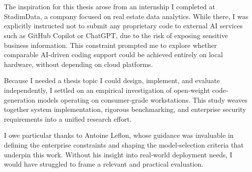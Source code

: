 \chapter*{}%
\label{ch:voorwoord}

The inspiration for this thesis arose from an internship I completed at StadimData, a company focused on real estate data analytics. While there, I was explicitly instructed not to submit any proprietary code to external \gls{AI} services such as GitHub Copilot or ChatGPT, due to the risk of exposing sensitive business information. This constraint prompted me to explore whether comparable AI‐driven coding support could be achieved entirely on local hardware, without depending on cloud platforms.

Because I needed a thesis topic I could design, implement, and evaluate independently, I settled on an empirical investigation of open‐weight code‐generation models operating on consumer‐grade workstations. This study weaves together system implementation, rigorous benchmarking, and enterprise security requirements into a unified research effort.

I owe particular thanks to Antoine Leflon, whose guidance was invaluable in defining the enterprise constraints and shaping the model‐selection criteria that underpin this work. Without his insight into real‐world deployment needs, I would have struggled to frame a relevant and practical evaluation.